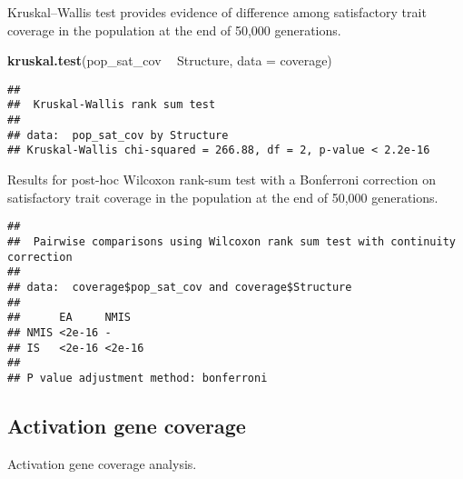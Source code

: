 \documentclass[]{book}
\newenvironment{Shaded}{\begin{snugshade}}{\end{snugshade}}
\newcommand{\DataTypeTok}[1]{\textcolor[rgb]{0.13,0.29,0.53}{#1}}
\newcommand{\KeywordTok}[1]{\textcolor[rgb]{0.13,0.29,0.53}{\textbf{#1}}}
\newcommand{\NormalTok}[1]{#1}
\newcommand{\OperatorTok}[1]{\textcolor[rgb]{0.81,0.36,0.00}{\textbf{#1}}}
\newcommand{\OtherTok}[1]{\textcolor[rgb]{0.56,0.35,0.01}{#1}}
\newcommand{\StringTok}[1]{\textcolor[rgb]{0.31,0.60,0.02}{#1}}
\begin{document}
Kruskal--Wallis test provides evidence of difference among satisfactory trait coverage in the population at the end of 50,000 generations.

\begin{Shaded}
\begin{Highlighting}[]
\KeywordTok{kruskal.test}\NormalTok{(pop_sat_cov }\OperatorTok{~}\StringTok{ }\NormalTok{Structure, }\DataTypeTok{data =}\NormalTok{ coverage)}
\end{Highlighting}
\end{Shaded}

\begin{verbatim}
## 
##  Kruskal-Wallis rank sum test
## 
## data:  pop_sat_cov by Structure
## Kruskal-Wallis chi-squared = 266.88, df = 2, p-value < 2.2e-16
\end{verbatim}

Results for post-hoc Wilcoxon rank-sum test with a Bonferroni correction on satisfactory trait coverage in the population at the end of 50,000 generations.

\begin{Shaded}
\end{Shaded}

\begin{verbatim}
## 
##  Pairwise comparisons using Wilcoxon rank sum test with continuity correction 
## 
## data:  coverage$pop_sat_cov and coverage$Structure 
## 
##      EA     NMIS  
## NMIS <2e-16 -     
## IS   <2e-16 <2e-16
## 
## P value adjustment method: bonferroni
\end{verbatim}

\hypertarget{activation-gene-coverage-8}{%
\subsection{Activation gene coverage}\label{activation-gene-coverage-8}}

Activation gene coverage analysis.
\end{document}
